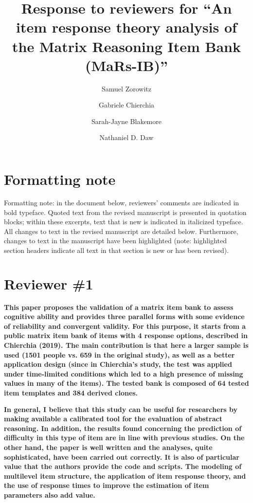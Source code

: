 \documentclass[a4paper,notitlepage,12pt]{article}
\author[1]{Samuel Zorowitz}
\author[3]{Gabriele Chierchia}
\author[3]{Sarah-Jayne Blakemore}
\author[1,2]{Nathaniel D. Daw}
\affil[1]{Princeton Neuroscience Institute, Princeton University, USA}
\affil[2]{Department of Psychology, Princeton University, USA}
\affil[3]{Department of Psychology, University of Cambridge, Downing Street, Cambridge, UK}
\title{Response to reviewers for ``An item response theory analysis of the Matrix Reasoning Item Bank (MaRs-IB)''}
\date{}
\begin{document}
\maketitle

\section*{Formatting note}

Formatting note: in the document below, reviewers’ comments are indicated in bold typeface. Quoted text from the revised manuscript is presented in quotation blocks; within these excerpts, text that is new is indicated in italicized typeface. All changes to text in the revised manuscript are detailed below. Furthermore, changes to text in the manuscript have been highlighted (note: highlighted section headers indicate all text in that section is new or has been revised). 

\section*{Reviewer \#1}

\textbf{This paper proposes the validation of a matrix item bank to assess cognitive ability and provides three parallel forms with some evidence of reliability and convergent validity. For this purpose, it starts from a public matrix item bank of items with 4 response options, described in Chierchia (2019). The main contribution is that here a larger sample is used (1501 people vs. 659 in the original study), as well as a better application design (since in Chierchia's study, the test was applied under time-limited conditions which led to a high presence of missing values in many of the items). The tested bank is composed of 64 tested item templates and 384 derived clones.}

\textbf{In general, I believe that this study can be useful for researchers by making available a calibrated tool for the evaluation of abstract reasoning. In addition, the results found concerning the prediction of difficulty in this type of item are in line with previous studies. On the other hand, the paper is well written and the analyses, quite sophisticated, have been carried out correctly. It is also of particular value that the authors provide the code and scripts. The modeling of multilevel item structure, the application of item response theory, and the use of response times to improve the estimation of item parameters also add value.}
\end{document}
